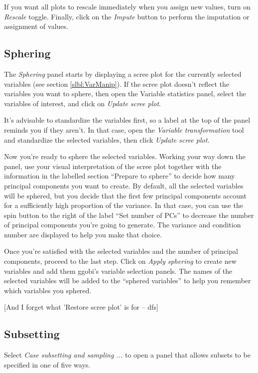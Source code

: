 \documentclass[11pt]{article}
\begin{document}
If you want all plots to rescale immediately when you assign new
values, turn on {\em Rescale} toggle.  Finally, click on the {\em Impute}
button to perform the imputation or assignment of values.

\subsection{Sphering}
\label{slbl:Sphering}

The {\em Sphering} panel starts by displaying a scree plot for the
currently selected variables (see section \ref{slbl:VarManip}).  If the
scree plot doesn't reflect the variables you want to sphere, then open
the Variable statistics panel, select the variables of interest, and
click on {\em Update scree plot}.

It's advisable to standardize the variables first, so a label at the top
of the panel reminds you if they aren't.  In that case, open the {\em
Variable transformation} tool and standardize the selected variables,
then click {\em Update scree plot.}

Now you're ready to sphere the selected variables.  Working your way down
the panel, use your visual interpretation of the scree plot together
with the information in the labelled section ``Prepare to sphere'' to
decide how many principal components you want to create.  By default,
all the selected variables will be sphered, but you decide that the first
few principal components account for a sufficiently high proportion of
the variance.  In that case, you can use the spin button to the right
of the label ``Set number of PCs'' to decrease the number of principal
components you're going to generate.  The variance and condition number
are displayed to help you make that choice.

Once you're satisfied with the selected variables and the number of
principal components, proceed to the last step.  Click on {\em Apply
sphering} to create new variables and add them ggobi's variable selection
panels.  The names of the selected variables will be added to the
``sphered variables'' to help you remember which variables you sphered.

[And I forget what 'Restore scree plot' is for -- dfs]

\subsection{Subsetting}

Select {\em Case subsetting and sampling ...} to open a panel
that allows subsets to be specified in one of five ways.
\end{document}
